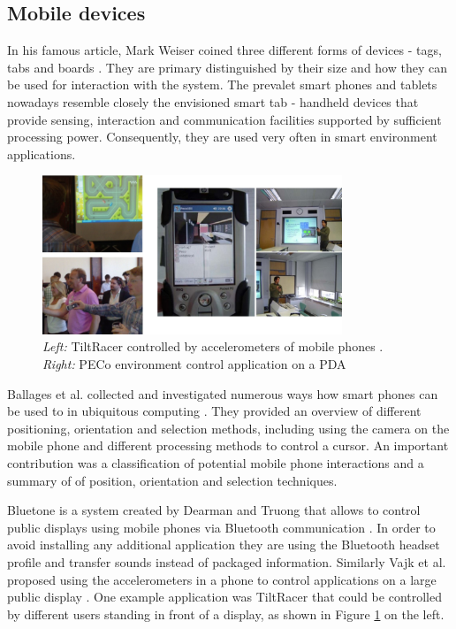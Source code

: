 \subsection{Mobile devices}
In his famous article, Mark Weiser coined three different forms of devices - tags, tabs and boards \cite{Weiser1991}. They are primary distinguished by their size and how they can be used for interaction with the system. The prevalet smart phones and tablets nowadays resemble closely the envisioned smart tab - handheld devices that provide sensing, interaction and communication facilities supported by sufficient processing power. Consequently, they are used very often in smart environment applications.

\begin{figure}[ht]
\centering
\includegraphics[width=0.8\textwidth]{images/rel_app_mobile}
\caption{\emph{Left:} TiltRacer controlled by accelerometers of mobile phones \cite{vajk2007using}. \emph{Right:} PECo environment control application on a PDA \cite{shirehjini2004novel}}
\label{fig:rel_app_mobile}
\end{figure}

Ballages et al. collected and investigated numerous ways how smart phones can be used to in ubiquitous computing \cite{ballagas2006smart}. They provided an overview of different positioning, orientation and selection methods, including using the camera on the mobile phone and different processing methods to control a cursor. An important contribution was a classification of potential mobile phone interactions and a summary of of position, orientation and selection techniques.

Bluetone is a system created by Dearman and Truong that allows to control public displays using mobile phones via Bluetooth communication \cite{dearman2009bluetone}. In order to avoid installing any additional application they are using the Bluetooth headset profile and transfer sounds instead of packaged information. Similarly Vajk et al. proposed using the accelerometers in a phone to control applications on a large public display \cite{vajk2007using}. One example application was TiltRacer that could be controlled by different users standing in front of a display, as shown in Figure \ref{fig:rel_app_mobile} on the left.

